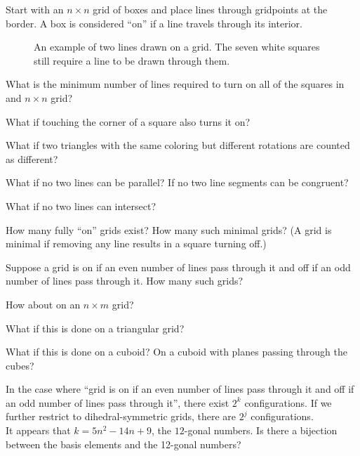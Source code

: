 \documentclass{article}
\begin{document}
  Start with an $n \times n$ grid of boxes and place lines through gridpoints at
  the border. A box is considered ``on'' if a line travels through its interior.
\begin{figure}[!h]
  \centering
  \caption{
    An example of two lines drawn on a grid. The seven white squares
    still require a line to be drawn through them.
  }
\end{figure}

\begin{question}
  What is the minimum number of lines required to turn on all of the squares in
  and $n\times n$ grid?
\end{question}
\begin{related}
  \item What if touching the corner of a square also turns it on?
  \item What if two triangles with the same coloring but different rotations are
    counted as different?
  \item What if no two lines can be parallel?
    If no two line segments can be congruent?
  \item What if no two lines can intersect?
  \item How many fully ``on'' grids exist? How many such minimal grids? (A grid is
    minimal if removing any line results in a square turning off.)
  \item Suppose a grid is on if an even number of lines pass through it and off
    if an odd number of lines pass through it. How many such grids?
  \item How about on an $n \times m$ grid?
  \item What if this is done on a triangular grid?
  \item What if this is done on a cuboid? On a cuboid with planes passing
    through the cubes?
\end{related}
\begin{note}
  In the case where ``grid is on if an even number of lines pass through it and
  off if an odd number of lines pass through it'', there exist $2^k$
  configurations. If we further restrict to dihedral-symmetric grids, there
  are $2^j$ configurations.\\
  It appears that $k = 5n^2 - 14n + 9$, the $12$-gonal numbers. Is there a
  bijection between the basis elements and the 12-gonal numbers?
\end{note}
\end{document}
